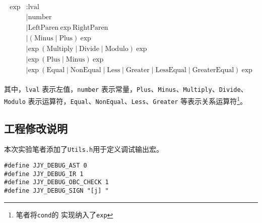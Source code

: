 \documentclass[../main.tex]{subfiles}
\begin{document}
\begin{gather*}
	\begin{aligned}
		\text{exp} & \colon  \text{lval}                                                                                                                                    \\
		           & \mid \text{number}                                                                                                                                     \\
		           & \mid \text{LeftParen} \ \text{exp} \ \text{RightParen}                                                                                                 \\
		           & \mid (\text{Minus} \mid \text{Plus}) \ \text{exp}                                                                                                      \\
		           & \mid \text{exp} \ (\text{Multiply} \mid \text{Divide} \mid \text{Modulo}) \ \text{exp}                                                                 \\
		           & \mid \text{exp} \ (\text{Plus} \mid \text{Minus}) \ \text{exp}                                                                                         \\
		           & \mid \text{exp} \ (\text{Equal} \mid \text{NonEqual} \mid \text{Less} \mid \text{Greater} \mid \text{LessEqual} \mid \text{GreaterEqual}) \ \text{exp}
	\end{aligned}
\end{gather*}

其中，\texttt{lval} 表示左值，\texttt{number} 表示常量，\texttt{Plus}、\texttt{Minus}、\texttt{Multiply}、\texttt{Divide}、\texttt{Modulo} 表示运算符，\texttt{Equal}、\texttt{NonEqual}、\texttt{Less}、\texttt{Greater} 等表示关系运算符\footnote{笔者将\texttt{cond}的 实现纳入了\texttt{exp}}。


\songti
\subsection{工程修改说明}

本次实验笔者添加了\texttt{Utils.h}用于定义调试输出宏。

\begin{mdframed}
	\begin{verbatim}
#define JJY_DEBUG_AST 0
#define JJY_DEBUG_IR 1
#define JJY_DEBUG_OBC_CHECK 1
#define JJY_DEBUG_SIGN "[j] "
  \end{verbatim}
\end{mdframed}
\end{document}
